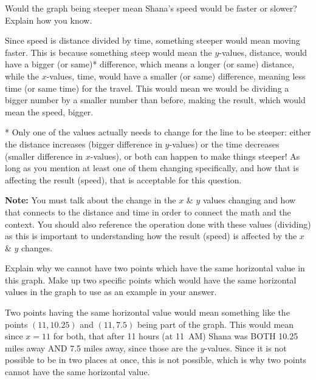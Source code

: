 \documentclass[12pt]{ximera}
\begin{document}
\begin{problem}
Would the graph being steeper mean Shana's speed would be faster or slower? Explain how
you know.

\begin{freeResponse}
\end{freeResponse}

\begin{solution}
Since speed is distance divided by time, something steeper would mean moving faster.
This is because something steep would mean the $y$-values, distance, would have a
bigger (or same)* difference, which means a longer (or same) distance, while the
$x$-values, time, would have a smaller (or same) difference, meaning less time (or same
time) for the travel. This would mean we would be dividing a bigger number by a smaller
number than before, making the result, which would mean the speed, bigger.

* Only one of the values actually needs to change for the line to be steeper: either
the distance increases (bigger difference in $y$-values) or the time decreases (smaller
difference in $x$-values), or both can happen to make things steeper! As long as you
mention at least one of them changing specifically, and how that is affecting the
result (speed), that is acceptable for this question.

\textbf{Note:} You must talk about the change in the $x$ \& $y$ values changing and how
that connects to the distance and time in order to connect the math and the context.
You should also reference the operation done with these values (dividing) as this is
important to understanding how the result (speed) is affected by the $x$ \& $y$
changes.
\end{solution}
\end{problem}

\begin{problem}
Explain why we cannot have two points which have the same horizontal value in this
graph. Make up two specific points which would have the same horizontal values in the
graph to use as an example in your answer.

\begin{freeResponse}
\end{freeResponse}

\begin{solution}
Two points having the same horizontal value would mean something like the points
$(11, 10.25)$ and $(11, 7.5)$ being part of the graph. This would mean since $x = 11$
for both, that after 11 hours (at 11~AM) Shana was BOTH 10.25 miles away AND 7.5 miles
away, since those are the $y$-values. Since it is not possible to be in two places at
once, this is not possible, which is why two points cannot have the same horizontal
value.
\end{solution}
\end{problem}
\end{document}
